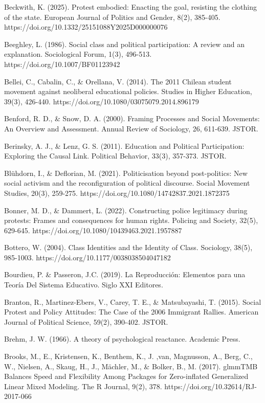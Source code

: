 \documentclass[
  13pt,
]{article}
\begin{document}
Beckwith, K. (2025). Protest embodied: Enacting the goal, resisting the
clothing of the state. European Journal of Politics and Gender, 8(2),
385-405. https://doi.org/10.1332/25151088Y2025D000000076

Beeghley, L. (1986). Social class and political participation: A review
and an explanation. Sociological Forum, 1(3), 496-513.
https://doi.org/10.1007/BF01123942

Bellei, C., Cabalin, C., \& Orellana, V. (2014). The 2011 Chilean
student movement against neoliberal educational policies. Studies in
Higher Education, 39(3), 426-440.
https://doi.org/10.1080/03075079.2014.896179

Benford, R. D., \& Snow, D. A. (2000). Framing Processes and Social
Movements: An Overview and Assessment. Annual Review of Sociology, 26,
611-639. JSTOR.

Berinsky, A. J., \& Lenz, G. S. (2011). Education and Political
Participation: Exploring the Causal Link. Political Behavior, 33(3),
357-373. JSTOR.

Blühdorn, I., \& Deflorian, M. (2021). Politicisation beyond
post-politics: New social activism and the reconfiguration of political
discourse. Social Movement Studies, 20(3), 259-275.
https://doi.org/10.1080/14742837.2021.1872375

Bonner, M. D., \& Dammert, L. (2022). Constructing police legitimacy
during protests: Frames and consequences for human rights. Policing and
Society, 32(5), 629-645. https://doi.org/10.1080/10439463.2021.1957887

Bottero, W. (2004). Class Identities and the Identity of Class.
Sociology, 38(5), 985-1003. https://doi.org/10.1177/0038038504047182

Bourdieu, P. \& Passeron, J.C. (2019). La Reproducción: Elementos para
una Teoría Del Sistema Educativo. Siglo XXI Editores.

Branton, R., Martinez-Ebers, V., Carey, T. E., \& Matsubayashi, T.
(2015). Social Protest and Policy Attitudes: The Case of the 2006
Immigrant Rallies. American Journal of Political Science, 59(2),
390-402. JSTOR.

Brehm, J. W. (1966). A theory of psychological reactance. Academic
Press.

Brooks, M., E., Kristensen, K., Benthem, K., J. ,van, Magnusson, A.,
Berg, C., W., Nielsen, A., Skaug, H., J., Mächler, M., \& Bolker, B., M.
(2017). glmmTMB Balances Speed and Flexibility Among Packages for
Zero-inflated Generalized Linear Mixed Modeling. The R Journal, 9(2),
378. https://doi.org/10.32614/RJ-2017-066
\end{document}
